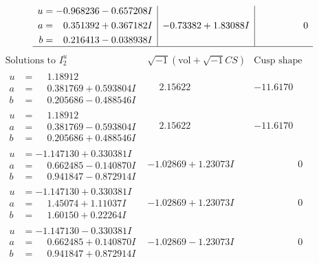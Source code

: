 \documentclass[1p]{elsarticle_modified}
\theoremstyle{definition}
\newcommand{\I}{\sqrt{-1}}
\begin{document}
$$\begin{array}{c|c|c}
\begin{aligned}
u &= -0.968236 - 0.657208 I \\
a &= \phantom{-}0.351392 + 0.367182 I \\
b &= \phantom{-}0.216413 - 0.038938 I\end{aligned}
 & -0.73382 + 1.83088 I & \phantom{-0.000000 } 0\\
 \hline 
 \end{array}$$\newpage$$\begin{array}{c|c|c}  
\text{Solutions to }I^u_{2}& \I (\text{vol} + \sqrt{-1}CS) & \text{Cusp shape}\\
 \hline 
\begin{aligned}
u &= \phantom{-}1.18912\phantom{ +0.000000I} \\
a &= \phantom{-}0.381769 + 0.593804 I \\
b &= \phantom{-}0.205686 - 0.488546 I\end{aligned}
 & \phantom{-}2.15622\phantom{ +0.000000I} & -11.6170\phantom{ +0.000000I} \\ \hline\begin{aligned}
u &= \phantom{-}1.18912\phantom{ +0.000000I} \\
a &= \phantom{-}0.381769 - 0.593804 I \\
b &= \phantom{-}0.205686 + 0.488546 I\end{aligned}
 & \phantom{-}2.15622\phantom{ +0.000000I} & -11.6170\phantom{ +0.000000I} \\ \hline\begin{aligned}
u &= -1.147130 + 0.330381 I \\
a &= \phantom{-}0.662485 - 0.140870 I \\
b &= \phantom{-}0.941847 - 0.872914 I\end{aligned}
 & -1.02869 + 1.23073 I & \phantom{-0.000000 } 0 \\ \hline\begin{aligned}
u &= -1.147130 + 0.330381 I \\
a &= \phantom{-}1.45074 + 1.11037 I \\
b &= \phantom{-}1.60150 + 0.22264 I\end{aligned}
 & -1.02869 + 1.23073 I & \phantom{-0.000000 } 0 \\ \hline\begin{aligned}
u &= -1.147130 - 0.330381 I \\
a &= \phantom{-}0.662485 + 0.140870 I \\
b &= \phantom{-}0.941847 + 0.872914 I\end{aligned}
 & -1.02869 - 1.23073 I & \phantom{-0.000000 } 0 \\ \hline\begin{aligned}

\end{aligned}
\end{array}$$
\end{document}
